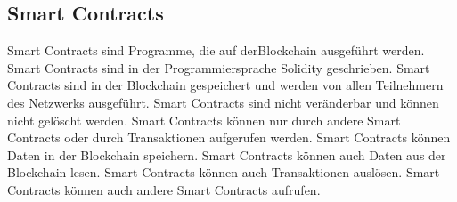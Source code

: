 \subsection{Smart Contracts}
Smart Contracts sind Programme, die auf derBlockchain ausgeführt werden. Smart Contracts 
sind in der Programmiersprache Solidity geschrieben. Smart Contracts sind in der Blockchain
gespeichert und werden von allen Teilnehmern des Netzwerks ausgeführt. Smart Contracts sind
nicht veränderbar und können nicht gelöscht werden. Smart Contracts können nur durch andere
Smart Contracts oder durch Transaktionen aufgerufen werden. Smart Contracts können Daten
in der Blockchain speichern. Smart Contracts können auch Daten aus der Blockchain lesen.
Smart Contracts können auch Transaktionen auslösen. Smart Contracts können auch andere
Smart Contracts aufrufen.